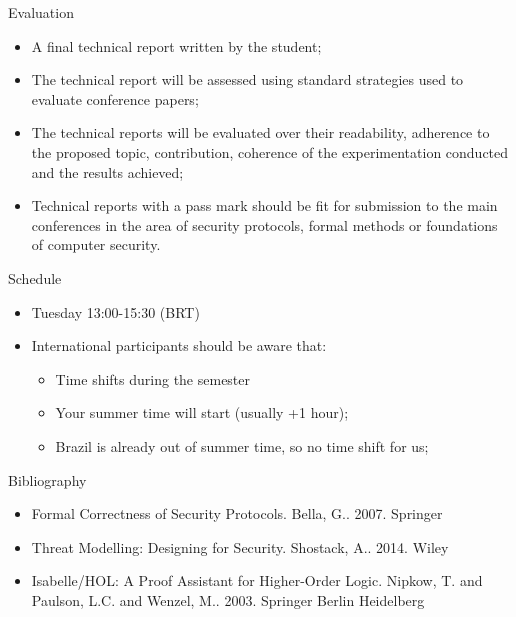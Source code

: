 \documentclass[12pt]{beamer}
\begin{document}
\begin{frame}{Evaluation}
\begin{itemize}
\item A final technical report written by the student;\pause
\item The technical report will be assessed using standard strategies used to evaluate conference papers;\pause
\item The technical reports will be evaluated over their readability, adherence to the
proposed topic, contribution, coherence of the experimentation conducted and the results achieved;\pause
\item Technical reports with a pass mark should be fit for submission to the main conferences in the area of security protocols, formal methods or foundations of computer security.
\end{itemize}
\end{frame}

\begin{frame}{Schedule}
\begin{itemize}
\item Tuesday 13:00-15:30 (BRT)\pause
\item International participants should be aware that:
\begin{itemize}
\item Time shifts during the semester
\item Your summer time will start (usually +1 hour);
\item Brazil is already out of summer time, so no time shift for us;
\end{itemize}
\end{itemize}
\end{frame}

\begin{frame}{Bibliography}
\begin{itemize}
\item Formal Correctness of Security Protocols. Bella, G.. 2007. Springer
\item Threat Modelling: Designing for Security. Shostack, A.. 2014. Wiley
\item Isabelle/HOL: A Proof Assistant for Higher-Order Logic. Nipkow, T. and Paulson, L.C. and Wenzel, M.. 2003. Springer Berlin Heidelberg
\end{itemize}
\end{frame}
\end{document}
